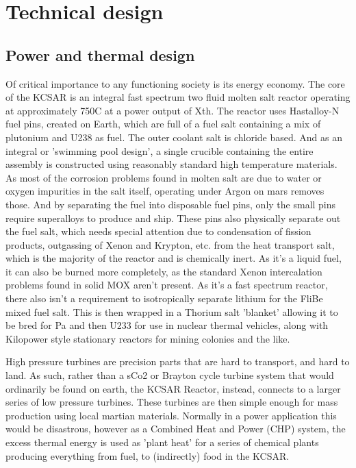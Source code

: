 \documentclass[10pt]{article}
\begin{document}
\section*{Technical design}
\subsection{Power and thermal design}
Of critical importance to any functioning society is its energy economy. The core of the KCSAR is an integral fast spectrum two fluid molten salt reactor operating at approximately 750C at a power output of Xth. The reactor uses Hastalloy-N fuel pins, created on Earth, which are full of a fuel salt containing a mix of plutonium and U238 as fuel. The outer coolant salt is chloride based. And as an integral or 'swimming pool design', a single crucible containing the entire assembly is constructed using reasonably standard high temperature materials. As most of the corrosion problems found in molten salt are due to water or oxygen impurities in the salt itself, operating under Argon on mars removes those. And by separating the fuel into disposable fuel pins, only the small pins require superalloys to produce and ship. These pins also physically separate out the fuel salt, which needs special attention due to condensation of fission products, outgassing of Xenon and Krypton, etc. from the heat transport salt, which is the majority of the reactor and is chemically inert. As it's a liquid fuel, it can also be burned more completely, as the standard Xenon intercalation problems found in solid MOX aren't present. As it's a fast spectrum reactor, there also isn't a requirement to isotropically separate lithium for the FliBe mixed fuel salt. This is then wrapped in a Thorium salt 'blanket' allowing it to be bred for Pa and then U233 for use in nuclear thermal vehicles, along with Kilopower style stationary reactors for mining colonies and the like.

High pressure turbines are precision parts that are hard to transport, and hard to land. As such, rather than a sCo2 or Brayton cycle turbine system that would ordinarily be found on earth, the KCSAR Reactor, instead, connects to a larger series of low pressure turbines. These turbines are then simple enough for mass production using local martian materials. Normally in a power application this would be disastrous, however as a Combined Heat and Power (CHP) system, the excess thermal energy is used as 'plant heat' for a series of chemical plants producing everything from fuel, to (indirectly) food in the KCSAR.
\end{document}
